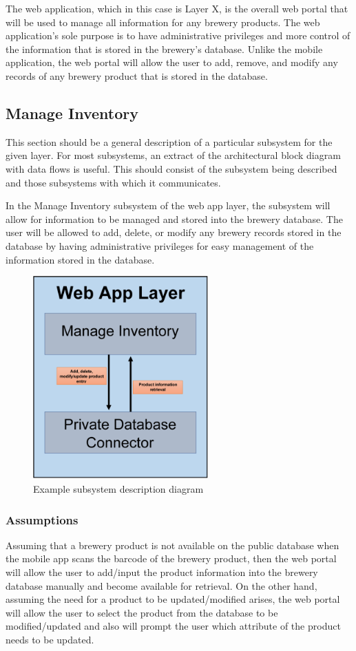 The web application, which in this case is Layer X, is the overall web portal that will be used to manage all information for any brewery products.  The web application's sole purpose is to have administrative privileges and more control of the information that is stored in the brewery's database.  Unlike the mobile application, the web portal will allow the user to add, remove, and modify any records of any brewery product that is stored in the database.

\subsection{Manage Inventory}
This section should be a general description of a particular subsystem for the given layer. For most subsystems, an extract of the architectural block diagram with data flows is useful. This should consist of the subsystem being described and those subsystems with which it communicates.

In the Manage Inventory subsystem of the web app layer, the subsystem will allow for information to be managed and stored into the brewery database.  The user will be allowed to add, delete, or modify any brewery records stored in the database by having administrative privileges for easy management of the information stored in the database.

\begin{figure}[h!]
	\centering
 	\includegraphics[width=0.60\textwidth]{images/web_app_layer.png}
 \caption{Example subsystem description diagram}
\end{figure}

\subsubsection{Assumptions}
Assuming that a brewery product is not available on the public database when the mobile app scans the barcode of the brewery product, then the web portal will allow the user to add/input the product information into the brewery database manually and become available for retrieval.  On the other hand, assuming the need for a product to be updated/modified arises, the web portal will allow the user to select the product from the database to be modified/updated and also will prompt the user which attribute of the product needs to be updated.

